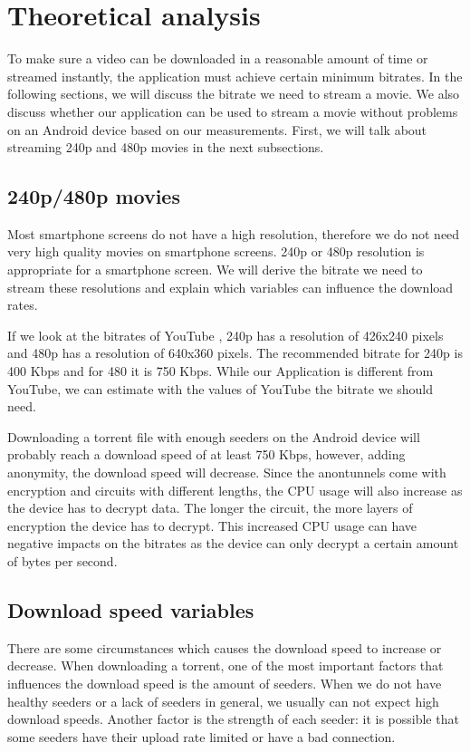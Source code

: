 \section{Theoretical analysis}
	To make sure a video can be downloaded in a reasonable amount of time or streamed instantly, the application must achieve certain minimum bitrates. In the following sections, we will discuss the bitrate we need to stream a movie. We also discuss whether our application can be used to stream a movie without problems on an Android device based on our measurements. First, we will talk about streaming 240p and 480p movies in the next subsections.
	
	\subsection{240p/480p movies}
		Most smartphone screens do not have a high resolution, therefore we do not need very high quality movies on smartphone screens. 240p or 480p resolution is appropriate for a smartphone screen. We will derive the bitrate we need to stream these resolutions and explain which variables can influence the download rates.
		
		If we look at the bitrates of YouTube \cite{googlebitrates}, 240p has a resolution of 426x240 pixels and 480p has a resolution of 640x360 pixels. The recommended bitrate for 240p is 400 Kbps and for 480 it is 750 Kbps. While our Application is different from YouTube, we can estimate with the values of YouTube the bitrate we should need.
		
		Downloading a torrent file with enough seeders on the Android device will probably reach a download speed of at least 750 Kbps, however, adding anonymity, the download speed will decrease. Since the anontunnels come with  encryption and circuits with different lengths, the CPU usage will also increase as the device has to decrypt data. The longer the circuit, the more layers of encryption the device has to decrypt. This increased CPU usage
		can have negative impacts on the bitrates as the device can only decrypt a certain amount of bytes per second.
		
	\subsection{Download speed variables}
		There are some circumstances which causes the download speed to increase or decrease. When downloading a torrent, one of the most important factors that influences the download speed is the amount of seeders. When we do not have healthy seeders or a lack of seeders in general, we usually can not expect high download speeds. Another factor is the strength of each seeder: it is possible that some seeders have their upload rate limited or have a bad connection.
		
